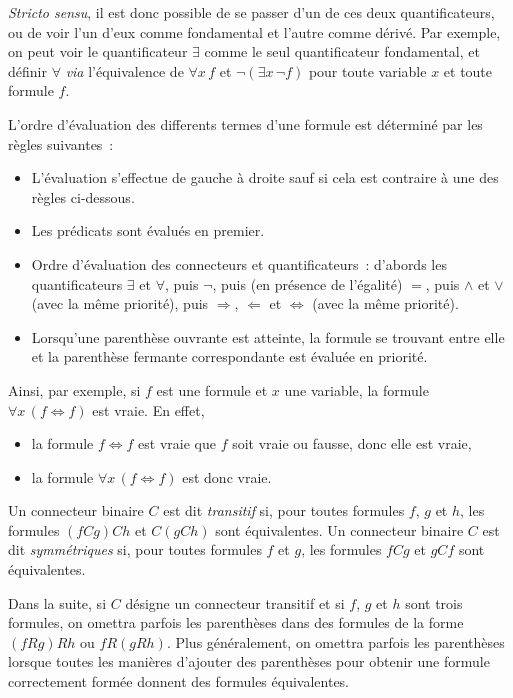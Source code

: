 \textit{Stricto sensu}, il est donc possible de se passer d'un de ces deux quantificateurs, ou de voir l'un d'eux comme fondamental et l'autre comme dérivé. 
Par exemple, on peut voir le quantificateur $\exists$ comme le seul quantificateur fondamental, et définir $\forall$ \textit{via} l'équivalence de $\forall x \, f$ et $\neg \left( \exists x \, \neg f \right)$ pour toute variable $x$ et toute formule $f$. 

L'ordre d'évaluation des differents termes d'une formule est déterminé par les règles suivantes : 
\begin{itemize}
    \item L'évaluation s'effectue de gauche à droite sauf si cela est contraire à une des règles ci-dessous.
    \item Les prédicats sont évalués en premier.
    \item Ordre d'évaluation des connecteurs et quantificateurs : d'abords les quantificateurs $\exists$ et $\forall$, puis $\neg$, puis (en présence de l'égalité) $=$, puis $\wedge$ et $\vee$ (avec la même priorité), puis $\Rightarrow$, $\Leftarrow$ et $\Leftrightarrow$ (avec la même priorité).
    \item Lorsqu'une parenthèse ouvrante est atteinte, la formule se trouvant entre elle et la parenthèse fermante correspondante est évaluée en priorité.
\end{itemize}

Ainsi, par exemple, si $f$ est une formule et $x$ une variable, la formule $\forall x \, (f \Leftrightarrow f)$ est vraie. 
En effet, 
\begin{itemize}[nosep]
    \item la formule $f \Leftrightarrow f$ est vraie que $f$ soit vraie ou fausse, donc elle est vraie,
    \item la formule $\forall x \, (f \Leftrightarrow f)$ est donc vraie.
\end{itemize}

Un connecteur binaire $C$ est dit \textit{transitif} si, pour toutes formules $f$, $g$ et $h$, les formules $(f C g) C h$ et $C (g C h)$ sont équivalentes.
Un connecteur binaire $C$ est dit \textit{symmétriques} si, pour toutes formules $f$ et $g$, les formules $f C g$ et $g C f$ sont équivalentes.

Dans la suite, si $C$ désigne un connecteur transitif et si $f$, $g$ et $h$ sont trois formules, on omettra parfois les parenthèses dans des formules de la forme $(f R g) R h$ ou $f R (g R h)$. 
Plus généralement, on omettra parfois les parenthèses lorsque toutes les manières d'ajouter des parenthèses pour obtenir une formule correctement formée donnent des formules équivalentes.

